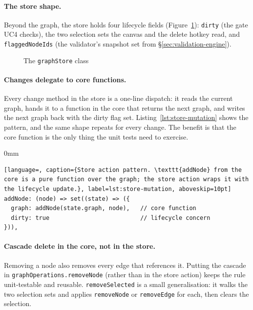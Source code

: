 \paragraph{The store shape.}
Beyond the graph, the store holds four lifecycle fields (Figure~\ref{fig:graphstore-class}): \texttt{dirty} (the gate UC4 checks), the two selection sets the canvas and the delete hotkey read, and \texttt{flaggedNodeIds} (the validator's snapshot set from \S\ref{sec:validation-engine}).

\begin{figure}[H]
    \centering
    \resizebox{0.95\textwidth}{!}{
        
    }
    \caption[The \texttt{graphStore} class.]{The \texttt{graphStore} class}
    \label{fig:graphstore-class}
\end{figure}

\pagebreak

\paragraph{Changes delegate to core functions.}
Every change method in the store is a one-line dispatch: it reads the current graph, hands it to a function in the core that returns the next graph, and writes the next graph back with the dirty flag set. Listing~\ref{lst:store-mutation} shows the pattern, and the same shape repeats for every change. The benefit is that the core function is the only thing the unit tests need to exercise.

\begin{addmargin}[0mm]{0mm}
\begin{lstlisting}[language=, caption={Store action pattern. \texttt{addNode} from the core is a pure function over the graph; the store action wraps it with the lifecycle update.}, label=lst:store-mutation, aboveskip=10pt]
addNode: (node) => set((state) => ({
  graph: addNode(state.graph, node),   // core function
  dirty: true                          // lifecycle concern
})),
\end{lstlisting}
\end{addmargin}


\paragraph{Cascade delete in the core, not in the store.}
Removing a node also removes every edge that references it. Putting the cascade in \texttt{graphOperations.removeNode} (rather than in the store action) keeps the rule unit-testable and reusable. \texttt{removeSelected} is a small generalisation: it walks the two selection sets and applies \texttt{removeNode} or \texttt{removeEdge} for each, then clears the selection.


